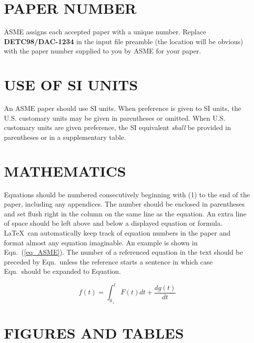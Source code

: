 \documentclass[twocolumn,10pt]{asme2e}
\begin{document}
\section*{PAPER NUMBER}

ASME assigns each accepted paper with a unique number. Replace {\bf DETC98/DAC-1234} in the input file preamble (the location will be obvious) with the paper number supplied to you  by ASME for your paper.


\section*{USE OF SI UNITS}

An ASME paper should use SI units.  When preference is given to SI units, the U.S. customary units may be given in parentheses or omitted. When U.S. customary units are given preference, the SI equivalent {\em shall} be provided in parentheses or in a supplementary table. 
\section*{MATHEMATICS}

Equations should be numbered consecutively beginning with (1) to the end of the paper, including any appendices.  The number should be enclosed in parentheses and set flush right in the column on the same line as the equation.  An extra line of space should be left above and below a displayed equation or formula. \LaTeX\ can automatically keep track of equation numbers in the paper and format almost any equation imaginable. An example is shown in Eqn.~(\ref{eq_ASME}). The number of a referenced equation in the text should be preceded by Eqn.\ unless the reference starts a sentence in which case Eqn.\ should be expanded to Equation.

\begin{equation}
f(t) = \int_{0_+}^t F(t) dt + \frac{d g(t)}{d t}
\label{eq_ASME}
\end{equation}

\section*{FIGURES AND TABLES}
\end{document}
